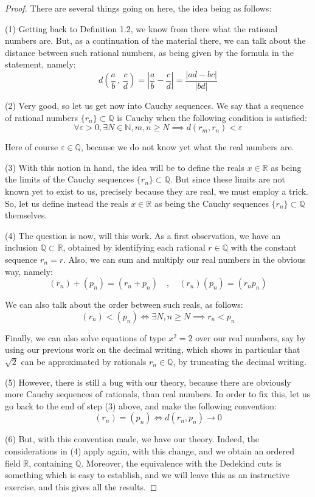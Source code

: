 \documentclass[12pt]{amsbook}
\begin{document}
\begin{proof}
There are several things going on here, the idea being as follows:

\medskip

(1) Getting back to Definition 1.2, we know from there what the rational numbers are. But, as a continuation of the material there, we can talk about the distance between such rational numbers, as being given by the formula in the statement, namely:
$$d\left(\frac{a}{b}\,,\,\frac{c}{d}\right)=\left|\frac{a}{b}-\frac{c}{d}\right|=\frac{|ad-bc|}{|bd|}$$

(2) Very good, so let us get now into Cauchy sequences. We say that a sequence of rational numbers $\{r_n\}\subset\mathbb Q$ is Cauchy when the following condition is satisfied:
$$\forall\varepsilon>0,\exists N\in\mathbb N, m,n\geq N\implies d(r_m,r_n)<\varepsilon$$

Here of course $\varepsilon\in\mathbb Q$, because we do not know yet what the real numbers are.

\medskip

(3) With this notion in hand, the idea will be to define the reals $x\in\mathbb R$ as being the limits of the Cauchy sequences $\{r_n\}\subset\mathbb Q$. But since these limits are not known yet to exist to us, precisely because they are real, we must employ a trick. So, let us define instead the reals $x\in\mathbb R$ as being the Cauchy sequences $\{r_n\}\subset\mathbb Q$ themselves.

\medskip

(4) The question is now, will this work. As a first observation, we have an inclusion $\mathbb Q\subset\mathbb R$, obtained by identifying each rational $r\in\mathbb Q$ with the constant sequence $r_n=r$. Also, we can sum and multiply our real numbers in the obvious way, namely:
$$(r_n)+(p_n)=(r_n+p_n)\quad,\quad (r_n)(p_n)=(r_np_n)$$

We can also talk about the order between such reals, as follows:
$$(r_n)<(p_n)\iff\exists N,n\geq N\implies r_n<p_n$$

Finally, we can also solve equations of type $x^2=2$ over our real numbers, say by using our previous work on the decimal writing, which shows in particular that $\sqrt{2}$ can be approximated by rationals $r_n\in\mathbb Q$, by truncating the decimal writing.

\medskip

(5) However, there is still a bug with our theory, because there are obviously more Cauchy sequences of rationals, than real numbers. In order to fix this, let us go back to the end of step (3) above, and make the following convention:
$$(r_n)=(p_n)\iff d(r_n,p_n)\to0$$

(6) But, with this convention made, we have our theory. Indeed, the considerations in (4) apply again, with this change, and we obtain an ordered field $\mathbb R$, containing $\mathbb Q$. Moreover, the equivalence with the Dedekind cuts is something which is easy to establish, and we will leave this as an instructive exercise, and this gives all the results.
\end{proof}
\end{document}
